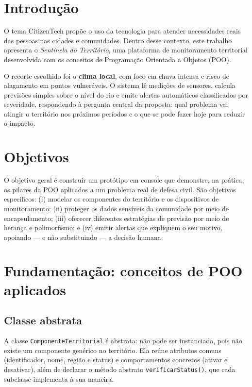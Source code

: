 \documentclass[12pt,a4paper]{article}
\begin{document}
\newpage
\tableofcontents
\thispagestyle{empty}

\newpage

\section{Introdução}

O tema CitizenTech propõe o uso da tecnologia para atender necessidades reais das pessoas nas cidades e comunidades. Dentro desse contexto, este trabalho apresenta o \textit{Sentinela do Território}, uma plataforma de monitoramento territorial desenvolvida com os conceitos de Programação Orientada a Objetos (POO).

O recorte escolhido foi o \textbf{clima local}, com foco em chuva intensa e risco de alagamento em pontos vulneráveis. O sistema lê medições de sensores, calcula previsões simples sobre o nível do rio e emite alertas automáticos classificados por severidade, respondendo à pergunta central da proposta: qual problema vai atingir o território nos próximos períodos e o que se pode fazer hoje para reduzir o impacto.

\section{Objetivos}

O objetivo geral é construir um protótipo em console que demonstre, na prática, os pilares da POO aplicados a um problema real de defesa civil. São objetivos específicos: (i) modelar os componentes do território e os dispositivos de monitoramento; (ii) proteger os dados sensíveis da comunidade por meio de encapsulamento; (iii) oferecer diferentes estratégias de previsão por meio de herança e polimorfismo; e (iv) emitir alertas que expliquem o seu motivo, apoiando — e não substituindo — a decisão humana.

\section{Fundamentação: conceitos de POO aplicados}

\subsection{Classe abstrata}
A classe \texttt{ComponenteTerritorial} é abstrata: não pode ser instanciada, pois não existe um componente genérico no território. Ela reúne atributos comuns (identificador, nome, região e status) e comportamentos concretos (ativar e desativar), além de declarar o método abstrato \texttt{verificarStatus()}, que cada subclasse implementa à sua maneira.
\end{document}
